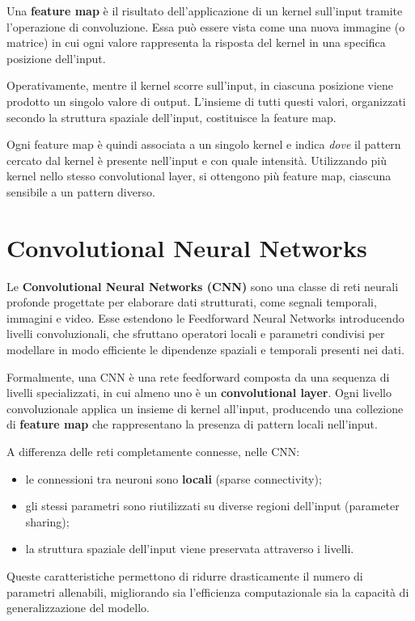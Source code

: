 \documentclass[a4paper,12pt]{report}
\begin{document}
Una \textbf{feature map} è il risultato dell’applicazione di un kernel sull’input tramite l’operazione di convoluzione.  
Essa può essere vista come una nuova immagine (o matrice) in cui ogni valore rappresenta la risposta del kernel in una specifica posizione dell’input.

Operativamente, mentre il kernel scorre sull’input, in ciascuna posizione viene prodotto un singolo valore di output.  
L’insieme di tutti questi valori, organizzati secondo la struttura spaziale dell’input, costituisce la feature map.

Ogni feature map è quindi associata a un singolo kernel e indica \emph{dove} il pattern cercato dal kernel è presente nell’input e con quale intensità.  
Utilizzando più kernel nello stesso convolutional layer, si ottengono più feature map, ciascuna sensibile a un pattern diverso.


\section{Convolutional Neural Networks}

Le \textbf{Convolutional Neural Networks (CNN)} sono una classe di reti neurali profonde progettate per elaborare dati strutturati, come segnali temporali, immagini e video.  
Esse estendono le Feedforward Neural Networks introducendo livelli convoluzionali, che sfruttano operatori locali e parametri condivisi per modellare in modo efficiente le dipendenze spaziali e temporali presenti nei dati.

Formalmente, una CNN è una rete feedforward composta da una sequenza di livelli specializzati, in cui almeno uno è un \textbf{convolutional layer}.  
Ogni livello convoluzionale applica un insieme di kernel all’input, producendo una collezione di \textbf{feature map} che rappresentano la presenza di pattern locali nell’input.

A differenza delle reti completamente connesse, nelle CNN:
\begin{itemize}
    \item le connessioni tra neuroni sono \textbf{locali} (sparse connectivity);
    \item gli stessi parametri sono riutilizzati su diverse regioni dell’input (parameter sharing);
    \item la struttura spaziale dell’input viene preservata attraverso i livelli.
\end{itemize}

Queste caratteristiche permettono di ridurre drasticamente il numero di parametri allenabili, migliorando sia l’efficienza computazionale sia la capacità di generalizzazione del modello.
\end{document}
